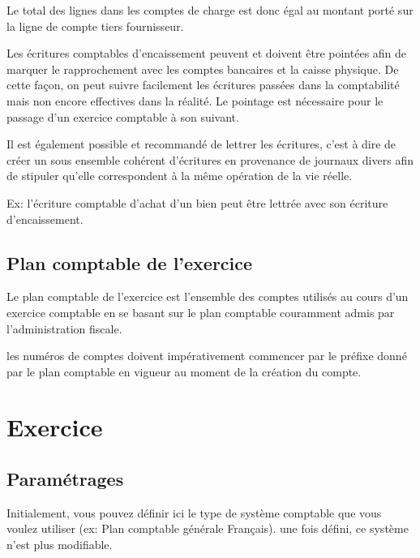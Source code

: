 \documentclass[a4paper,10pt,oneside,french]{sphinxmanual}
\begin{document}
Le total des lignes dans les comptes de charge est donc égal au montant
porté sur la ligne de compte tiers fournisseur.

Les écritures comptables d’encaissement peuvent et doivent être pointées afin de marquer le rapprochement avec les comptes bancaires et
la caisse physique. De cette façon, on peut suivre facilement les écritures passées dans la comptabilité mais non encore effectives dans
la réalité. Le pointage est nécessaire pour le passage d’un exercice comptable à son suivant.

Il est également possible et recommandé de lettrer les écritures, c’est à dire de créer un sous ensemble
cohérent d’écritures en provenance de journaux divers afin de stipuler qu’elle correspondent à la même opération de la vie réelle.

Ex: l’écriture comptable d’achat d’un bien peut être lettrée avec son écriture d’encaissement.


\subsection{Plan comptable de l’exercice}
\label{\detokenize{accounting/definition:plan-comptable-de-l-exercice}}
Le plan comptable de l’exercice est l’ensemble des comptes utilisés au
cours d’un exercice comptable en se basant sur le plan comptable
couramment admis par l’administration fiscale.

les numéros de comptes doivent impérativement commencer par le préfixe donné par le
plan comptable en vigueur au moment de la création du compte.


\section{Exercice}
\label{\detokenize{accounting/fiscalyear::doc}}\label{\detokenize{accounting/fiscalyear:exercice}}

\subsection{Paramétrages}
\label{\detokenize{accounting/fiscalyear:parametrages}}\begin{quote}

\noindent{}
\end{quote}

Initialement, vous pouvez définir ici le type de système comptable que
vous voulez utiliser (ex: Plan comptable générale Français).
 une fois défini, ce système n’est plus modifiable.
\end{document}
